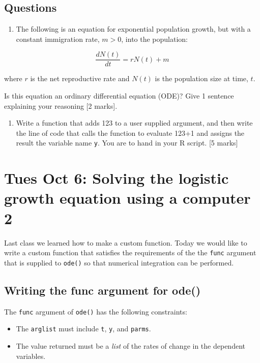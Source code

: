 \documentclass[]{book}
\providecommand{\tightlist}{%
  \setlength{\itemsep}{0pt}\setlength{\parskip}{0pt}}
\begin{document}
\section{Questions}\label{questions-9}

\begin{enumerate}
\def\labelenumi{\arabic{enumi}.}
\tightlist
\item
  The following is an equation for exponential population growth, but
  with a constant immigration rate, \(m >0\), into the population:
\end{enumerate}

\[
\frac{dN(t)}{dt}= rN(t) + m
\]

where \(r\) is the net reproductive rate and \(N(t)\) is the population
size at time, \(t\).

Is this equation an ordinary differential equation (ODE)? Give 1
sentence explaining your reasoning {[}2 marks{]}.

\begin{enumerate}
\def\labelenumi{\arabic{enumi}.}
\setcounter{enumi}{1}
\tightlist
\item
  Write a function that adds 123 to a user supplied argument, and then
  write the line of code that calls the function to evaluate 123+1 and
  assigns the result the variable name \texttt{y}. You are to hand in
  your R script. {[}5 marks{]}
\end{enumerate}

\chapter{Tues Oct 6: Solving the logistic growth equation using a
computer
2}\label{tues-oct-6-solving-the-logistic-growth-equation-using-a-computer-2}

Last class we learned how to make a custom function. Today we would like
to write a custom function that satisfies the requirements of the the
\texttt{func} argument that is supplied to \texttt{ode()} so that
numerical integration can be performed.

\section{Writing the func argument for
ode()}\label{writing-the-func-argument-for-ode}

The \texttt{func} argument of \texttt{ode()} has the following
constraints:

\begin{itemize}
\tightlist
\item
  The \texttt{arglist} must include \texttt{t}, \texttt{y}, and
  \texttt{parms}.
\item
  The value returned must be a \emph{list} of the rates of change in the
  dependent variables.
\end{itemize}
\end{document}
